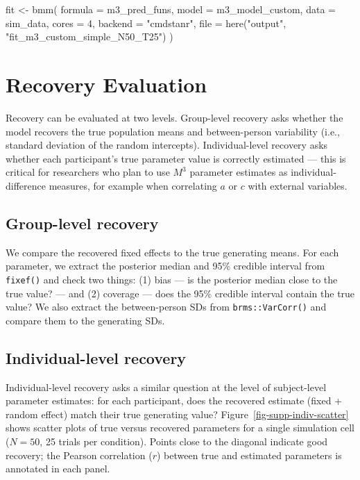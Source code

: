 \documentclass[
  man,
  floatsintext,
  longtable,
  nolmodern,
  notxfonts,
  notimes,
  colorlinks=true,linkcolor=blue,citecolor=blue,urlcolor=blue]{apa7}
\newenvironment{Shaded}{\begin{snugshade}}{\end{snugshade}}
\newcommand{\AttributeTok}[1]{\textcolor[rgb]{0.40,0.45,0.13}{#1}}
\newcommand{\DecValTok}[1]{\textcolor[rgb]{0.68,0.00,0.00}{#1}}
\newcommand{\FunctionTok}[1]{\textcolor[rgb]{0.28,0.35,0.67}{#1}}
\newcommand{\NormalTok}[1]{\textcolor[rgb]{0.00,0.23,0.31}{#1}}
\newcommand{\OtherTok}[1]{\textcolor[rgb]{0.00,0.23,0.31}{#1}}
\newcommand{\StringTok}[1]{\textcolor[rgb]{0.13,0.47,0.30}{#1}}
\begin{document}
\begin{Shaded}
\begin{Highlighting}[]
\NormalTok{fit }\OtherTok{\textless{}{-}} \FunctionTok{bmm}\NormalTok{(}
  \AttributeTok{formula =}\NormalTok{ m3\_pred\_funs,}
  \AttributeTok{model   =}\NormalTok{ m3\_model\_custom,}
  \AttributeTok{data    =}\NormalTok{ sim\_data,}
  \AttributeTok{cores   =} \DecValTok{4}\NormalTok{,}
  \AttributeTok{backend =} \StringTok{"cmdstanr"}\NormalTok{,}
  \AttributeTok{file    =} \FunctionTok{here}\NormalTok{(}\StringTok{"output"}\NormalTok{, }\StringTok{"fit\_m3\_custom\_simple\_N50\_T25"}\NormalTok{)}
\NormalTok{)}
\end{Highlighting}
\end{Shaded}

\section{Recovery Evaluation}\label{recovery-evaluation}

Recovery can be evaluated at two levels. Group-level recovery asks
whether the model recovers the true population means and between-person
variability (i.e., standard deviation of the random intercepts).
Individual-level recovery asks whether each participant's true parameter
value is correctly estimated --- this is critical for researchers who
plan to use \(M^3\) parameter estimates as individual-difference
measures, for example when correlating \(a\) or \(c\) with external
variables.

\subsection{Group-level recovery}\label{group-level-recovery}

We compare the recovered fixed effects to the true generating means. For
each parameter, we extract the posterior median and 95\% credible
interval from \texttt{fixef()} and check two things: (1) bias --- is the
posterior median close to the true value? --- and (2) coverage --- does
the 95\% credible interval contain the true value? We also extract the
between-person SDs from \texttt{brms::VarCorr()} and compare them to the
generating SDs.

\subsection{Individual-level recovery}\label{individual-level-recovery}

Individual-level recovery asks a similar question at the level of
subject-level parameter estimates: for each participant, does the
recovered estimate (fixed + random effect) match their true generating
value? Figure~\ref{fig-supp-indiv-scatter} shows scatter plots of true
versus recovered parameters for a single simulation cell (\(N = 50\), 25
trials per condition). Points close to the diagonal indicate good
recovery; the Pearson correlation (\(r\)) between true and estimated
parameters is annotated in each panel.
\end{document}
